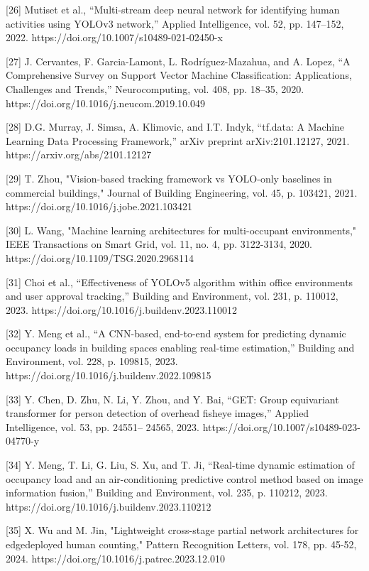 [26] Mutiset et al., ``Multi-stream deep neural network for identifying human activities
using YOLOv3 network,'' Applied Intelligence, vol. 52, pp. 147--152, 2022.
https://doi.org/10.1007/s10489-021-02450-x

[27] J. Cervantes, F. Garcia-Lamont, L. Rodríguez-Mazahua, and A. Lopez, ``A
Comprehensive Survey on Support Vector Machine Classification: Applications,
Challenges and Trends,'' Neurocomputing, vol. 408, pp. 18--35, 2020.
https://doi.org/10.1016/j.neucom.2019.10.049

[28] D.G. Murray, J. Simsa, A. Klimovic, and I.T. Indyk, ``tf.data: A Machine Learning Data
Processing Framework,'' arXiv preprint arXiv:2101.12127, 2021.
https://arxiv.org/abs/2101.12127

[29] T. Zhou, "Vision-based tracking framework vs YOLO-only baselines in commercial
buildings," Journal of Building Engineering, vol. 45, p. 103421, 2021.
https://doi.org/10.1016/j.jobe.2021.103421

[30] L. Wang, "Machine learning architectures for multi-occupant environments," IEEE
Transactions on Smart Grid, vol. 11, no. 4, pp. 3122-3134, 2020.
https://doi.org/10.1109/TSG.2020.2968114

[31] Choi et al., ``Effectiveness of YOLOv5 algorithm within office environments and user
approval tracking,'' Building and Environment, vol. 231, p. 110012, 2023.
https://doi.org/10.1016/j.buildenv.2023.110012




[32] Y. Meng et al., ``A CNN-based, end-to-end system for predicting dynamic occupancy
loads in building spaces enabling real-time estimation,'' Building and Environment, vol.
228, p. 109815, 2023. https://doi.org/10.1016/j.buildenv.2022.109815

[33] Y. Chen, D. Zhu, N. Li, Y. Zhou, and Y. Bai, ``GET: Group equivariant transformer for
person detection of overhead fisheye images,'' Applied Intelligence, vol. 53, pp. 24551--
24565, 2023. https://doi.org/10.1007/s10489-023-04770-y

[34] Y. Meng, T. Li, G. Liu, S. Xu, and T. Ji, ``Real-time dynamic estimation of occupancy
load and an air-conditioning predictive control method based on image information
fusion,'' Building and Environment, vol. 235, p. 110212, 2023.
https://doi.org/10.1016/j.buildenv.2023.110212

[35] X. Wu and M. Jin, "Lightweight cross-stage partial network architectures for edgedeployed human counting," Pattern Recognition Letters, vol. 178, pp. 45-52, 2024.
https://doi.org/10.1016/j.patrec.2023.12.010

